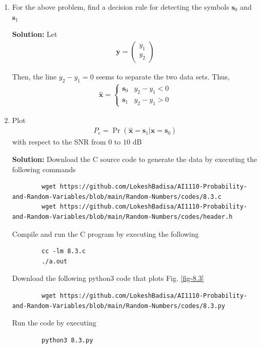 \documentclass[journal,12pt,twocolumn]{IEEEtran}
\newcommand{\solution}{\noindent \textbf{Solution: }}
\providecommand{\pr}[1]{\ensuremath{\Pr\left(#1\right)}}
\providecommand{\mbf}{\mathbf}
\let\vec\mathbf
\numberwithin{equation}{section}
\renewcommand\thesection{\arabic{section}}
\newcommand{\myvec}[1]{\ensuremath{\begin{pmatrix}#1\end{pmatrix}}}
\begin{document}
\begin{enumerate}[label=\thesection.\arabic*,ref=\thesection.\theenumi]
	\item For the above problem, find a decision rule for detecting the symbols $\mbf{s}_0 $ and $\mbf{s}_1$
	
	\solution Let
	\begin{align}
		\vec{y} = \myvec{y_1 \\ y_2}
	\end{align}
	
	Then, the line $y_2 - y_1 = 0$ seems to separate the two data sets. Thus,
	\begin{align}
		\hat{\vec{x}} = 
		\begin{cases}
			\vec{s}_0 & y_2 - y_1 < 0 \\
			\vec{s}_1 & y_2 - y_1 > 0
		\end{cases}
	\end{align}
	
	\item Plot 
	\begin{align} 
		P_e = \pr{\hat{\vec{x}} = \vec{s}_1|\vec{x} = \vec{s}_0}
	\end{align}
	with respect to the SNR from $0$ to $10$ $\mathrm{dB}$
	
	\solution Download the C source code to generate the data by executing the following commands
	\begin{lstlisting}
		wget https://github.com/LokeshBadisa/AI1110-Probability-and-Random-Variables/blob/main/Random-Numbers/codes/8.3.c
		wget https://github.com/LokeshBadisa/AI1110-Probability-and-Random-Variables/blob/main/Random-Numbers/codes/header.h
	\end{lstlisting}
	Compile and run the C program by executing the following
	\begin{lstlisting}
		cc -lm 8.3.c
		./a.out
	\end{lstlisting}
	
	Download the following python3 code that plots Fig. \ref{fig-8.3} 
	\begin{lstlisting}
		wget https://github.com/LokeshBadisa/AI1110-Probability-and-Random-Variables/blob/main/Random-Numbers/codes/8.3.py
	\end{lstlisting}
	Run the code by executing
	\begin{lstlisting}
		python3 8.3.py
	\end{lstlisting}
	

\end{enumerate}
\end{document}

